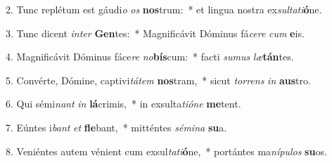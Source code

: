 2. Tunc replétum est gáudi\textit{o} \textit{os} \textbf{nos}trum:~*  et lingua nostra ex\textit{sul}\textit{ta}\textit{ti}\textbf{ó}ne.\

3. Tunc dicent \textit{in}\textit{ter} \textbf{Gen}tes:~*  Magnificávit Dóminus fá\textit{ce}\textit{re} \textit{cum} \textbf{e}is.\

4. Magnificávit Dóminus fáce\textit{re} \textit{no}\textbf{bís}cum:~*  facti \textit{su}\textit{mus} \textit{læ}\textbf{tán}tes.\

5. Convérte, Dómine, captivi\textit{tá}\textit{tem} \textbf{nos}tram,~*  sicut \textit{tor}\textit{rens} \textit{in} \textbf{aus}tro.\

6. Qui sémi\textit{nant} \textit{in} \textbf{lá}crimis,~*  in exsulta\textit{ti}\textit{ó}\textit{ne} \textbf{me}tent.\

7. Eúntes i\textit{bant} \textit{et} \textbf{fle}bant,~*  mitténtes \textit{sé}\textit{mi}\textit{na} \textbf{su}a.\

8. Veniéntes autem vénient cum exsul\textit{ta}\textit{ti}\textbf{ó}ne,~*  portántes ma\textit{ní}\textit{pu}\textit{los} \textbf{su}os.\


